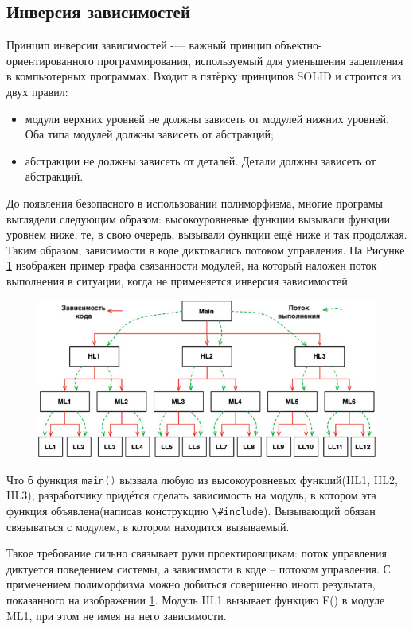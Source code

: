 \subsection{Инверсия зависимостей}

Принцип инверсии зависимостей -— важный принцип объектно-ориентированного программирования, используемый для уменьшения зацепления в компьютерных программах. Входит в пятёрку принципов SOLID и строится из двух правил:
\begin{itemize}
	\item модули верхних уровней не должны зависеть от модулей нижних уровней. Оба типа модулей должны зависеть от абстракций;
	\item абстракции не должны зависеть от деталей. Детали должны зависеть от абстракций.
\end{itemize}

До появления безопасного в использовании полиморфизма, многие програмы выглядели следующим образом: высокоуровневые функции вызывали функции уровнем ниже, те, в свою очередь, вызывали функции ещё ниже и так продолжая. Таким образом, зависимости в коде диктовались потоком управления. На Рисунке \ref{img:direct:dep} изображен пример графа связанности модулей, на который наложен поток выполнения в ситуации, когда не применяется инверсия зависимостей.

\begin{figure}[h]
  \centering
    \includegraphics{inc/img/direct.jpeg}
  \label{img:direct:dep}
\end{figure}

Что б функция \lstinline[language=C]{main()} вызвала любую из высокоуровневых функций(HL1, HL2, HL3), разработчику придётся сделать зависимость на модуль, в котором эта функция объявлена(написав конструкцию \lstinline[language=C]{\#include}). Вызывающий обязан связываться с модулем, в котором находится вызываемый.

Такое требование сильно связывает руки проектировщикам: поток управления диктуется поведением системы, а зависимости в коде -- потоком управления. С применением полиморфизма можно добиться совершенно иного результата, показанного на изображении \ref{img:direct:dep}. Модуль HL1 вызывает функцию F() в модуле ML1, при этом не имея на него зависимости.

